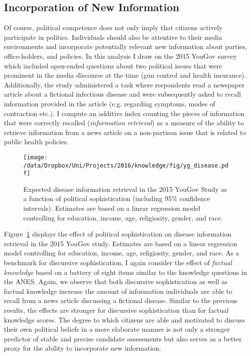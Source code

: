 \subsection{Incorporation of New Information}
Of course, political competence does not only imply that citizens actively participate in politics. Individuals should also be attentive to their media environments and incorporate potentially relevant new information about parties, office-holders, and policies. In this analysis I draw on the 2015 YouGov survey which included open-ended questions about two political issues that were prominent in the media discourse at the time (gun control and health insurance). Additionally, the study administered a task where respondents read a newspaper article about a fictional infectious disease and were subsequently asked to recall information provided in the article (e.g. regarding symptoms, modes of contraction etc.). I compute an additive index counting the pieces of information that were correctly recalled (\textit{information retrieval}) as a measure of the ability to retrieve information from a news article on a non-partisan issue that is related to public health policies. 

\begin{figure}[h]\centering
\texttt{[image: /data/Dropbox/Uni/Projects/2016/knowledge/fig/yg\_disease.pdf]}
\caption{Expected disease information retrieval in the 2015 YouGov Study as a function of political sophistication (including 95\% confidence intervals). Estimates are based on a linear regression model controlling for education, income, age, religiosity, gender, and race.}\label{fig:yg_disease}
\end{figure}

Figure~\ref{fig:yg_disease} displays the effect of political sophistication on disease information retrieval in the 2015 YouGov study. Estimates are based on a linear regression model controlling for education, income, age, religiosity, gender, and race. As a benchmark for discursive sophistication, I again consider the effect of \textit{factual knowledge} based on a battery of eight items similar to the knowledge questions in the ANES. Again, we observe that both discursive sophistication as well as factual knowledge increase the amount of information individuals are able to recall from a news article discussing a fictional disease. Similar to the previous results, the effects are stronger for discursive sophistication than for factual knowledge scores. The degree to which citizens are able and motivated to discuss their own political beliefs in a more elaborate manner is not only a stronger predictor of stable and precise candidate assessments but also serves as a better proxy for the ability to incorporate new information.



